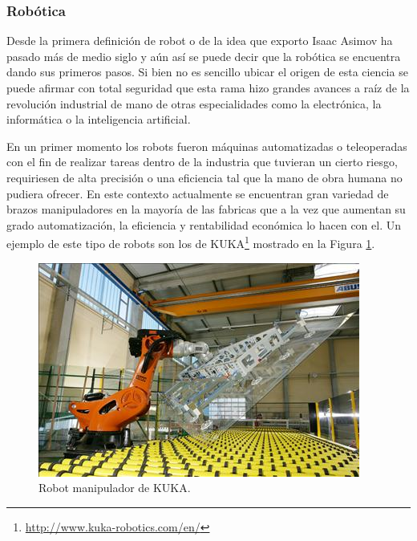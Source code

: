 \documentclass[12pt,a4paper,final,twoside]{article}
\begin{document}
\subsubsection{Robótica}

Desde la primera definición de robot o de la idea que exporto Isaac Asimov ha pasado más de medio siglo y aún así se puede decir que la robótica se encuentra dando sus primeros pasos. Si bien no es sencillo ubicar el origen de esta ciencia se puede afirmar con total seguridad que esta rama hizo grandes avances a raíz de la revolución industrial de mano de otras especialidades como la electrónica, la informática o la inteligencia artificial.

En un primer momento los robots fueron máquinas automatizadas o teleoperadas con el fin de realizar tareas dentro de la industria que tuvieran un cierto riesgo, requiriesen de alta precisión o una eficiencia tal que la mano de obra humana no pudiera ofrecer. En este contexto actualmente se encuentran gran variedad de brazos manipuladores en la mayoría de las fabricas que a la vez que aumentan su grado automatización, la eficiencia y rentabilidad económica lo hacen con el\cite{libroblanco}. Un ejemplo de este tipo de robots son los de KUKA\footnote{\url{http://www.kuka-robotics.com/en/}} mostrado en la Figura \ref{fig:kuka}.
 
\begin{figure}[h!]
	\centering
    \includegraphics[scale=3]	{images/kuka.jpg}
	 \caption{Robot manipulador de KUKA.}
  \label{fig:kuka}
\end{figure}
\end{document}
